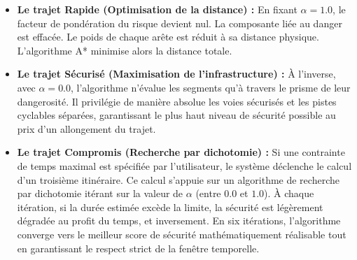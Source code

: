 \begin{itemize}
    \item \textbf{Le trajet Rapide (Optimisation de la distance) :} En fixant $\alpha = 1.0$, le facteur de pondération du risque devient nul.
    La composante liée au danger est effacée. Le poids de chaque arête est réduit à sa distance physique. L'algorithme A* minimise alors la distance totale.
    
    \item \textbf{Le trajet Sécurisé (Maximisation de l'infrastructure) :} À l'inverse, avec $\alpha = 0.0$, l'algorithme n'évalue les segments qu'à travers le prisme de leur dangerosité. 
    Il privilégie de manière absolue les voies sécurisés et les pistes cyclables séparées, garantissant le plus haut niveau de sécurité possible au prix d'un allongement du trajet.
    
    \item \textbf{Le trajet Compromis (Recherche par dichotomie) :} Si une contrainte de temps maximal est spécifiée par l'utilisateur, le système déclenche le calcul d'un troisième itinéraire. 
    Ce calcul s'appuie sur un algorithme de recherche par dichotomie itérant sur la valeur de $\alpha$ (entre $0.0$ et $1.0$). 
    À chaque itération, si la durée estimée excède la limite, la sécurité est légèrement dégradée au profit du temps, et inversement. 
    En six itérations, l'algorithme converge vers le meilleur score de sécurité mathématiquement réalisable tout en garantissant le respect strict de la fenêtre temporelle.
\end{itemize}